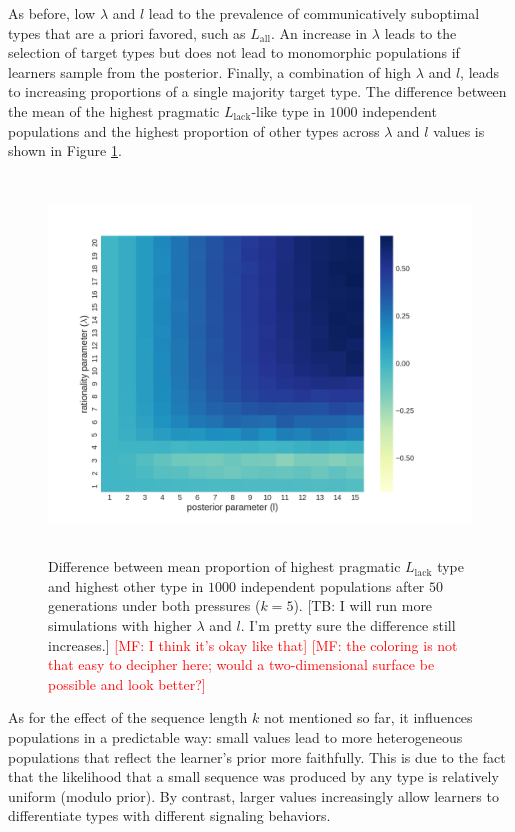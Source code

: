 \documentclass[a4paper, 11pt]{article}
\theoremstyle{Satz}
\newcommand{\mf}[1]{\textcolor{Red}{[MF: #1]}}
\newcommand{\tb}[1]{\textcolor[rgb]{.8,.33,.0}{[TB: #1]}}%
\newcommand{\mylang}[1]{\ensuremath{L_{\text{#1}}}\xspace} %
\newcommand{\Lall}{\mylang{all}}
\newcommand{\Llack}{\mylang{lack}}
\begin{document}
As before, low $\lambda$ and $l$ lead to the prevalence of communicatively suboptimal types
that are a priori favored, such as $\Lall$. An increase in $\lambda$ leads to the selection of
target types but does not lead to monomorphic populations if learners sample from the
posterior. Finally, a combination of high $\lambda$ and $l$, leads to increasing proportions of
a single majority target type. The difference between the mean of the highest pragmatic
$\Llack$-like type in $1000$ independent populations and the highest proportion of other types
across $\lambda$ and $l$ values is shown in Figure \ref{fig:diff}.

\begin{figure}[t]
\centering
\includegraphics[width=1\textwidth,height=10cm,keepaspectratio]{./plots/fig4-incumbents-difference}
\caption{Difference between mean proportion of highest pragmatic $\Llack$ type and highest
  other type in $1000$ independent populations after $50$ generations under both pressures ($k
  = 5$). \tb{I will run more simulations with higher $\lambda$ and $l$. I'm pretty sure the
    difference still increases.} \mf{I think it's okay like that} \mf{the coloring is not that
    easy to decipher here; would a two-dimensional surface be possible and look better?}}
\label{fig:diff}
\end{figure}

As for the effect of the sequence length $k$ not mentioned so far, it influences populations in
a predictable way: small values lead to more heterogeneous populations that reflect the
learner's prior more faithfully. This is due to the fact that the likelihood that a small
sequence was produced by any type is relatively uniform (modulo prior). By contrast, larger
values increasingly allow learners to differentiate types with different signaling behaviors.
\end{document}
